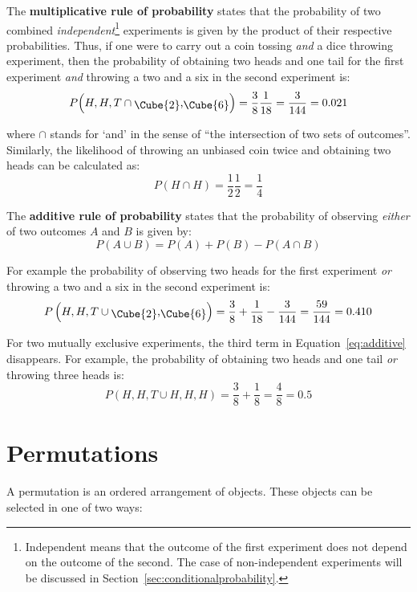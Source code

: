 The \textbf{multiplicative rule of
  probability}\label{page:multiplication} states that the probability
of two combined \emph{independent}\footnote{Independent means that the
outcome of the first experiment does not depend on the outcome of the
second. The case of non-independent experiments will be discussed in
Section~\ref{sec:conditionalprobability}.} experiments is given by the
product of their respective probabilities. Thus, if one were to carry
out a coin tossing \emph{and} a dice throwing experiment, then the
probability of obtaining two heads and one tail for the first
experiment \emph{and} throwing a two and a six in the second
experiment is:
\[
P\!\left(H,H,T \cap \mbox{\raisebox{-2pt}{\Cube{2}},\raisebox{-2pt}{\Cube{6}}}
\right) =
\frac{3}{8}\frac{1}{18} = \frac{3}{144} = 0.021
\]

\noindent where $\cap$ stands for `and' in the sense of ``the
intersection of two sets of outcomes''. Similarly, the likelihood of
throwing an unbiased coin twice and obtaining two heads can be
calculated as:
\[
P(H \cap H) = \frac{1}{2}\frac{1}{2} = \frac{1}{4}
\]

The \textbf{additive rule of probability}\label{page:addition} states
that the probability of observing \emph{either} of two outcomes $A$
and $B$ is given by:
\begin{equation}
  P({A}\cup{B}) = P(A) + P(B) - P({A}\cap{B})
  \label{eq:additive}
\end{equation}

For example the probability of observing two heads for the first
experiment \emph{or} throwing a two and a six in the second experiment
is:
\[
P\left(H,H,T \cup \mbox{\raisebox{-2pt}{\Cube{2}},\raisebox{-2pt}{\Cube{6}}}\right) =
\frac{3}{8} + \frac{1}{18} - \frac{3}{144} = \frac{59}{144} = 0.410
\]

For two mutually exclusive experiments, the third term in
Equation~\ref{eq:additive} disappears. For example, the probability of
obtaining two heads and one tail \emph{or} throwing three heads is:
\[
P\left(H,H,T \cup H,H,H\right) = \frac{3}{8} + \frac{1}{8} = \frac{4}{8} = 0.5
\]

\section{Permutations}
\label{sec:permutations}

A permutation is an ordered arrangement of objects. These objects can
be selected in one of two ways:

